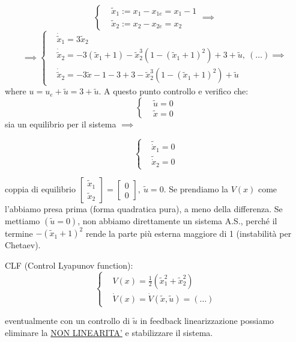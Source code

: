 \begin{itemize}
\[
	\left\{
	\begin{aligned}
	&\tilde{x}_1 := x_1-x_{1e} = x_1-1\\
	&\tilde{x}_2 := x_2-x_{2e} = x_2
	\end{aligned}
	\right. \implies\
\]
\[
	\implies
	\left\{
	\begin{aligned}
	&\dot{\tilde{x}}_1 = 3\tilde{x}_2\\
	&\dot{\tilde{x}}_2 = -3(\tilde{x}_1+1) -\tilde{x}_2^3(1 - (\tilde{x}_1+1)^2) + 3 + \tilde{u},\ (\dots) \implies\\
	&\dot{\tilde{x}}_2 = -3\tilde{x}-1 -3+3 -\tilde{x}_2^3(1 - (\tilde{x}_1+1)^2) + \tilde{u}
	\end{aligned}
	\right.
\]
where $u = u_e + \tilde{u} = 3+\tilde{u}$. A questo punto controllo e verifico che:
\[
	\left\{
	\begin{aligned}
	&\tilde{u} = 0\\
	&\tilde{x} = 0
	\end{aligned}
	\right.
\]
sia un equilibrio per il sistema $\implies$

\[
	\left\{
	\begin{aligned}
	&\tilde{\dot{x}}_1 = 0\\
	&\tilde{\dot{x}}_2 = 0
	\end{aligned}
	\right.
\]

coppia di equilibrio $\begin{bmatrix}\tilde{x}_1\\ \tilde{x}_2\end{bmatrix} = \begin{bmatrix}0\\0\end{bmatrix},\ \tilde{u} = 0$.
Se prendiamo la $V(x)$ come l'abbiamo presa prima (forma quadratica pura), a meno della differenza. Se mettiamo $(\tilde{u}=0)$, non abbiamo direttamente un sistema A.S., perché il termine $-(\tilde{x}_1+1)^2$ rende la parte più esterna maggiore di 1 (instabilità per Chetaev).

CLF (Control Lyapunov function):
\[
	\left\{
	\begin{aligned}
	&V(x) = \frac{1}{2}(\tilde{x}_1^2 + \tilde{x}_2^2)\\
	&\dot{V}(x) = \dot{V}(\tilde{x},\tilde{u}) = (\dots)
	\end{aligned}
	\right.
\]

eventualmente con un controllo di $\tilde{u}$ in feedback linearizzazione possiamo eliminare la \underline{NON LINEARITA'} e stabilizzare il sistema.


\end{itemize}
